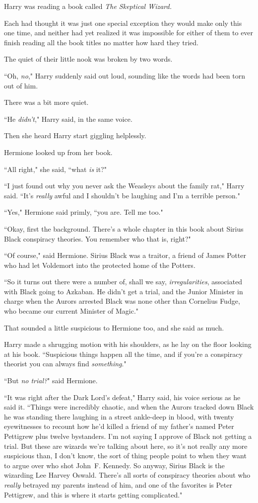 Harry was reading a book called \emph{The Skeptical Wizard.}

Each had thought it was just one special exception they would make only this one time, and neither had yet realized it was impossible for either of them to ever finish reading all the book titles no matter how hard they tried.

The quiet of their little nook was broken by two words.

``Oh, \emph{no}," Harry suddenly said out loud, sounding like the words had been torn out of him.

There was a bit more quiet.

``He \emph{didn't}," Harry said, in the same voice.

Then she heard Harry start giggling helplessly.

Hermione looked up from her book.

``All right," she said, ``what \emph{is} it?"

``I just found out why you never ask the Weasleys about the family rat," Harry said. ``It's \emph{really} awful and I shouldn't be laughing and I'm a terrible person."

``Yes," Hermione said primly, ``you are. Tell me too."

``Okay, first the background. There's a whole chapter in this book about Sirius Black conspiracy theories. You remember who that is, right?"

``Of course," said Hermione. Sirius Black was a traitor, a friend of James Potter who had let Voldemort into the protected home of the Potters.

``So it turns out there were a number of, shall we say, \emph{irregularities}, associated with Black going to Azkaban. He didn't get a trial, and the Junior Minister in charge when the Aurors arrested Black was none other than Cornelius Fudge, who became our current Minister of Magic."

That sounded a little suspicious to Hermione too, and she said as much.

Harry made a shrugging motion with his shoulders, as he lay on the floor looking at his book. ``Suspicious things happen all the time, and if you're a conspiracy theorist you can always find \emph{something}."

``But \emph{no trial?}" said Hermione.

``It was right after the Dark Lord's defeat," Harry said, his voice serious as he said it. ``Things were incredibly chaotic, and when the Aurors tracked down Black he was standing there laughing in a street ankle-deep in blood, with twenty eyewitnesses to recount how he'd killed a friend of my father's named Peter Pettigrew plus twelve bystanders. I'm not saying I approve of Black not getting a trial. But these are wizards we're talking about here, so it's not really any more suspicious than, I don't know, the sort of thing people point to when they want to argue over who shot John~F. Kennedy. So anyway, Sirius Black is the wizarding Lee Harvey Oswald. There's all sorts of conspiracy theories about who \emph{really} betrayed my parents instead of him, and one of the favorites is Peter Pettigrew, and this is where it starts getting complicated."

